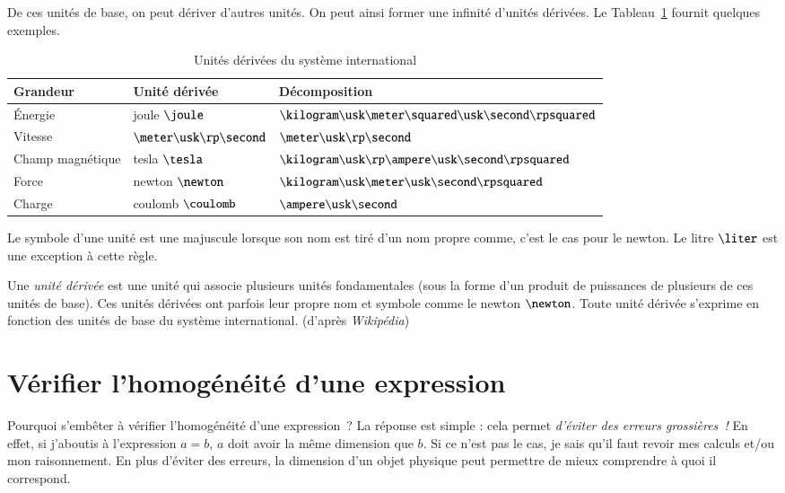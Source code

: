 \documentclass[12pt]{book}
\begin{document}
De ces unités de base, on peut dériver d'autres unités. On peut ainsi former une
infinité d'unités dérivées. Le Tableau~\ref{usi_deriv} fournit quelques exemples.

\begin{table}[ht!]
	\centering
	\caption{Unités dérivées du système international}
	\begin{tabular}{lll}
		\textbf{Grandeur} & \textbf{Unité dérivée} & \textbf{Décomposition}\\ \hline
		Énergie & joule $\joule$ & $\kilogram \usk \meter \squared \usk \second \rpsquared$\\
		Vitesse &  $\meter \usk \rp \second$ & $\meter \usk \rp \second$\\
		Champ magnétique & tesla $\tesla$ & $\kilogram \usk \rp \ampere \usk \second \rpsquared$ \\ 
		Force & newton $\newton$  & $\kilogram \usk \meter \usk \second \rpsquared$ \\
		Charge & coulomb $\coulomb$ &  $\ampere \usk \second$
	\end{tabular}
	\label{usi_deriv}
\end{table}

\begin{rema}
	Le symbole d'une unité est une majuscule lorsque son nom est 
	tiré d'un nom propre comme, c'est le cas pour le newton. Le litre
	$\liter$ est une exception à cette règle.
\end{rema}

\begin{defn}
Une \emph{unité dérivée} est une unité qui associe plusieurs unités fondamentales
(sous la forme d'un produit de puissances de plusieurs de ces unités de base).
Ces unités dérivées ont parfois leur propre nom et symbole comme le newton
$\newton$. Toute unité dérivée s'exprime en fonction des unités de base du système 
international. (d'après \textit{Wikipédia})

\end{defn}


\section{Vérifier l'homogénéité d'une expression}
Pourquoi s'embêter à vérifier l'homogénéité d'une expression~?
La réponse est simple : cela permet \emph{d'éviter des erreurs grossières~!} En effet,
si j'aboutis à l'expression $a = b$, $a$ doit avoir la même dimension que $b$. 
Si ce n'est pas le cas, je sais qu'il faut revoir mes calculs et/ou mon raisonnement.
En plus d'éviter des erreurs, la dimension d'un objet physique 
peut permettre de mieux comprendre à quoi il correspond. 
\end{document}
